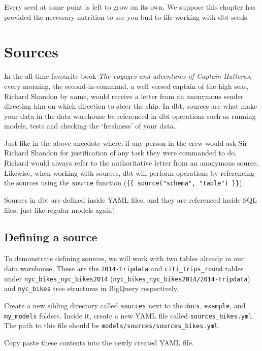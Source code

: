 \documentclass[
]{book}
\begin{document}
Every seed at some point is left to grow on its own. We suppose this chapter has provided the necessary nutrition to see you bud to life working with dbt seeds.

\hypertarget{sources-1}{%
\chapter{Sources}\label{sources-1}}

In the all-time favourite book \emph{The voyages and adventures of Captain Hatteras}, every morning, the second-in-command, a well versed captain of the high seas, Richard Shandon by name, would receive a letter from an anonymous sender directing him on which direction to steer the ship. In dbt, sources are what make your data in the data warehouse be referenced in dbt operations such as running models, tests and checking the `freshness' of your data.

Just like in the above anecdote where, if any person in the crew would ask Sir Richard Shandon for justification of any task they were commanded to do, Richard would always refer to the authoritative letter from an anonymous source. Likewise, when working with sources, dbt will perform operations by referencing the sources using the \texttt{source} function (\texttt{\{\{\ source("schema",\ "table")\ \}\}}).

Sources in dbt are defined inside YAML files, and they are referenced inside SQL files, just like regular models again!

\hypertarget{defining-a-source}{%
\section{Defining a source}\label{defining-a-source}}

To demonstrate defining sources, we will work with two tables already in our data warehouse. These are the \texttt{2014-tripdata} and \texttt{citi\_trips\_round} tables under \texttt{nyc\_bikes\_nyc\_bikes2014} (\texttt{nyc\_bikes\_nyc\_bikes2014/2014-tripdata}) and \texttt{nyc\_bikes} tree structures in BigQuery respectively.

Create a new sibling directory called \texttt{sources} next to the \texttt{docs}, \texttt{example}, and \texttt{my\_models} folders. Inside it, create a new YAML file called \texttt{sources\_bikes.yml}. The path to this file should be \texttt{models/sources/sources\_bikes.yml}.

Copy paste these contents into the newly created YAML file.
\end{document}
